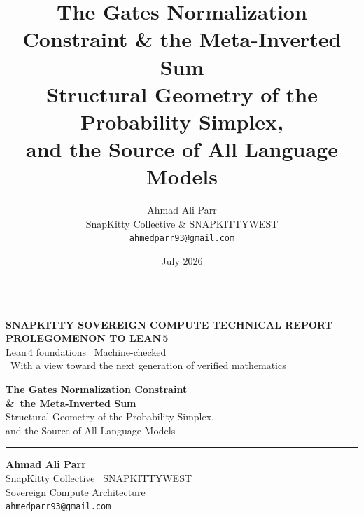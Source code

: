 \documentclass[11pt]{article}
\title{\textbf{The Gates Normalization Constraint \& the Meta-Inverted Sum}\\
\large Structural Geometry of the Probability Simplex,\\
and the Source of All Language Models}
\author{
Ahmad Ali Parr\\
SnapKitty Collective \& SNAPKITTYWEST\\
\texttt{ahmedparr93@gmail.com}
}
\date{July 2026}
\begin{document}
\thispagestyle{empty}
\begin{titlepage}
\setlength{\parindent}{0pt}
\vspace*{-0.5cm}

{\color{leanblue}\rule{\textwidth}{2pt}}

\vspace{0.4cm}
\begin{center}
{\color{leangray}\small\bfseries\MakeUppercase{%
  SnapKitty Sovereign Compute \quad\textbullet\quad Technical Report}}
\\[0.15cm]
{\color{leanblue}\Large\bfseries\MakeUppercase{Prolegomenon to Lean\,5}}
\\[0.1cm]
{\color{leangray}\small Lean\,4 foundations \textbullet\ Machine-checked \\
  \textbullet\ With a view toward the next generation of verified mathematics}
\end{center}

\vspace{1.2cm}

\begin{center}
{\color{leandark}\bfseries\fontsize{26}{30}\selectfont
  The Gates Normalization Constraint\\[0.1cm]
  \&\ the Meta-Inverted Sum}
\\[0.5cm]
{\color{leangray}\large Structural Geometry of the Probability Simplex,\\[0.1cm]
  and the Source of All Language Models}
\end{center}

\vspace{1.0cm}

{\color{leanblue}\rule{\textwidth}{1pt}}

\vspace{0.5cm}
\begin{center}
{\bfseries Ahmad Ali Parr}\\[0.15cm]
{\color{leangray}SnapKitty Collective \textbullet\ SNAPKITTYWEST\\
  Sovereign Compute Architecture\\
  \texttt{ahmedparr93@gmail.com}}
\end{center}

\vspace{0.6cm}

\noindent{}
\end{titlepage}
\end{document}
